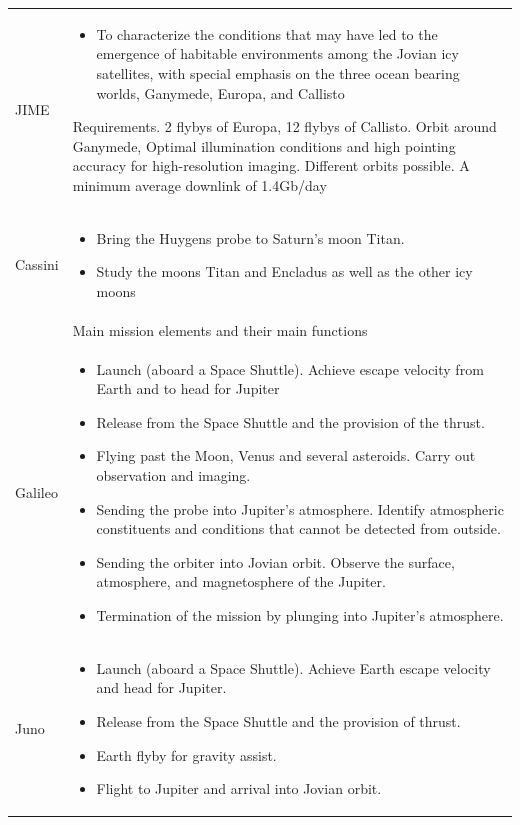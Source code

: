 \begin{supertabular}{p{.1\textwidth}p{.9\textwidth}}
  JIME &
  \begin{itemize}
  \item To characterize the conditions that may have led to the
    emergence of habitable environments among the Jovian icy
    satellites, with special emphasis on the three ocean bearing
    worlds, Ganymede, Europa, and Callisto
  \end{itemize}

  Requirements. 2 flybys of Europa, 12 flybys of Callisto. Orbit
  around Ganymede, Optimal illumination conditions and high pointing
  accuracy for high-resolution imaging. Different orbits possible. A
  minimum average downlink of 1.4Gb/day \\

  Cassini &
  \begin{itemize}
    \item Bring the Huygens probe to Saturn’s moon Titan.
    \item Study the moons Titan and Encladus as well as the other icy
      moons
  \end{itemize} \\

  & Main mission elements and their main functions \\
  \hline

  Galileo & \begin{itemize}
  \item Launch (aboard a Space Shuttle). Achieve escape velocity
    from Earth and to head for Jupiter
  \item Release from the Space Shuttle and the provision of the
    thrust.
  \item Flying past the Moon, Venus and several asteroids. Carry out
    observation and imaging.
  \item Sending the probe into Jupiter's atmosphere. Identify
    atmospheric constituents and conditions that cannot be detected from
    outside.
  \item Sending the orbiter into Jovian orbit. Observe the surface,
    atmosphere, and magnetosphere of the Jupiter.
  \item Termination of the mission by plunging into Jupiter's
    atmosphere.
  \end{itemize} \\

  Juno & \begin{itemize}
  \item Launch (aboard a Space Shuttle). Achieve Earth escape velocity
    and head for Jupiter.
  \item Release from the Space Shuttle and the provision of
    thrust.
  \item Earth flyby for gravity assist.
  \item Flight to Jupiter and arrival into Jovian orbit.
  \end{itemize} \\


\end{supertabular}
